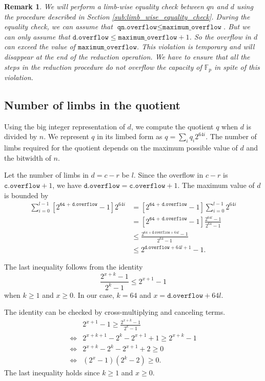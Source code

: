 \documentclass[a4paper, 12pt]{article}
\newtheorem*{remark}{Remark}
\begin{document}
\begin{remark}
  We will perform a limb-wise equality check between $qn$ and $d$ using the procedure described in Section \ref{sub:limb_wise_equality_check}. During the equality check, we can assume that $\texttt{qn.overflow} \le \texttt{maximum\_overflow}$. But we can only assume that $\texttt{d.overflow} \le \texttt{maximum\_overflow} + 1$. So the overflow in $d$ can exceed the value of $\texttt{maximum\_overflow}$. This violation is temporary and will disappear at the end of the reduction operation. We have to ensure that all the steps in the reduction procedure do not overflow the capacity of $\mathbb{F}_p$ in spite of this violation.
\end{remark}

\subsection{Number of limbs in the quotient}

Using the big integer representation of $d$, we compute the quotient $q$ when $d$ is divided by $n$. We represent $q$ in its limbed form as $q = \sum_{i} q_i 2^{64i}$. The number of limbs required for the quotient depends on the maximum possible value of $d$ and the bitwidth of $n$.

Let the number of limbs in $d = c-r$ be $l$. Since the overflow in $c-r$ is $\texttt{c.overflow}+1$, we have $\texttt{d.overflow} = \texttt{c.overflow}+1$. The maximum value of $d$ is bounded by 
\begin{align*}
\sum_{i=0}^{l-1} \left[2^{\texttt{64 + d.overflow}}-1\right]2^{64i} & = \left[2^{\texttt{64 + d.overflow}}-1\right]\sum_{i=0}^{l-1} 2^{64i} \\\
& =  \left[2^{\texttt{64 + d.overflow}}-1\right] \frac{2^{64l}-1}{2^{64}-1}\\
& \le \frac{2^{64+\texttt{d.overflow}+64l}-1}{2^{64}-1} \\
& \le 2^{\texttt{d.overflow} + 64l+1} -1.
\end{align*}
         
The last inequality follows from the identity 
$$\frac{2^{x+k}-1}{2^{k}-1} \le 2^{x+1}-1$$
when $k \ge 1$ and $x \ge 0$. In our case, $k=64$ and $x=\texttt{d.overflow}+64l$.

The identity can be checked by cross-multiplying and canceling terms.
\begin{align*}
& 2^{x+1}-1 \ge \frac{2^{x+k}-1}{2^{k}-1} \\
\iff & 2^{x+k+1} - 2^k - 2^{x+1} +1 \ge 2^{x+k} -1 \\
\iff & 2^{x+k} - 2^k - 2^{x+1} + 2 \ge 0 \\
\iff & (2^x-1)(2^k-2) \ge 0.
\end{align*}
The last inequality holds since $k \ge 1$ and $x \ge 0$.
\end{document}
